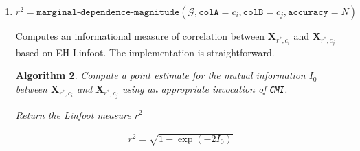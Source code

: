 \documentclass[10pt,letterpaper]{article}
\newtheorem{algorithm}{Algorithm}[section]
\newcommand{\set}[1]{\{#1\}}
\newcommand{\G}{\mathcal{G}}
\begin{document}
\begin{enumerate}
    \begin{algorithm} \label{alg:marginal_depprob} First obtain a set of mutual
        information estimates by invoking {\tt CMI}

        \begin{align*}
        \set{I_k} = {\tt CMI}(
        \G,
        A = \set{(r_i^*,c_i)}, B = \set{(r_i^*,c_j)}, C = \emptyset, D =
        \emptyset,\\ {\tt accuracy} = N, {\tt size} = N)
        \end{align*}

        Return the fraction of samples from $\set{I_k}$ for which the mutual
        information is zero
        \begin{align*}
            p = \frac{1}{|\set{I_k}|}\sum_{k}{\mathbb{I}_{\set{0}}(I_k)}
        \end{align*}
    \end{algorithm}

\item $r^2 = \texttt{marginal-dependence-magnitude}(\G,
    \texttt{colA}=c_i,
    \texttt{colB}=c_j,
    \texttt{accuracy}=N)$

    Computes an informational measure of correlation between
    $\mathbf{X}_{r^*,c_i}$ and $\mathbf{X}_{r^*,c_j}$ based on EH Linfoot. The
    implementation is straightforward.

    \begin{algorithm} \label{alg:linfoot} Compute a point estimate for the
        mutual information $I_0$ between $\mathbf{X}_{r^*,c_i}$ and
        $\mathbf{X}_{r^*,c_j}$ using an appropriate invocation of {\tt CMI}.

        Return the Linfoot measure $r^2$

        \begin{align*}
        r^2 = \sqrt{1 - \exp{(-2I_0)}}
        \end{align*}

    \end{algorithm}



\end{enumerate}
\end{document}
